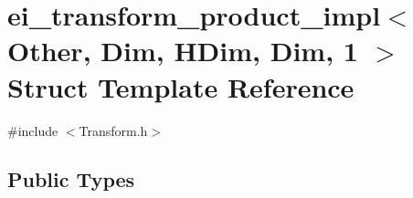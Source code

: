 \hypertarget{structei__transform__product__impl_3_01_other_00_01_dim_00_01_h_dim_00_01_dim_00_011_01_4}{\section{ei\-\_\-transform\-\_\-product\-\_\-impl$<$ Other, Dim, H\-Dim, Dim, 1 $>$ Struct Template Reference}
\label{structei__transform__product__impl_3_01_other_00_01_dim_00_01_h_dim_00_01_dim_00_011_01_4}
}


{\ttfamily \#include $<$Transform.\-h$>$}

\subsection*{Public Types}
